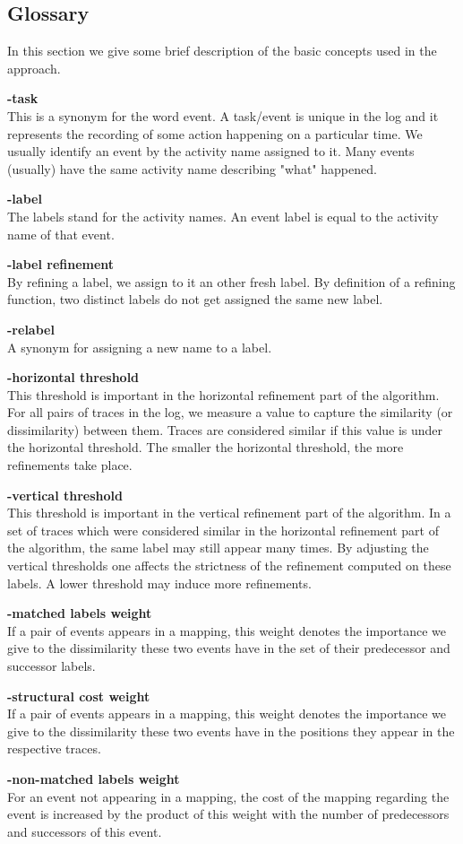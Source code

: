 \documentclass[notitlepage]{article}
\begin{document}
\begin{flushleft}
\section{Glossary}
In this section we give some brief description of the basic concepts used in the approach.
\medskip

\textbf{-task}\\
This is a synonym for the word event.
A task/event is unique in the log and it represents the recording of some action happening on a particular time.
We usually identify an event by the activity name assigned to it.
Many events (usually) have the same activity name describing "what" happened.
\medskip

\textbf{-label}\\
The labels stand for the activity names.
An event label is equal to the activity name of that event.
\medskip

\textbf{-label refinement}\\
By refining a label, we assign to it an other fresh label.
By definition of a refining function, two distinct labels do not get assigned the same new label.
\medskip

\textbf{-relabel}\\
A synonym for assigning a new name to a label.
\medskip

\textbf{-horizontal threshold}\\
This threshold is important in the horizontal refinement part of the algorithm.
For all pairs of traces in the log, we measure a value to capture the similarity (or dissimilarity) between them.
Traces are considered similar if this value is under the horizontal threshold.
The smaller the horizontal threshold, the more refinements take place.
\medskip

\textbf{-vertical threshold}\\
This threshold is important in the vertical refinement part of the algorithm.
In a set of traces which were considered similar in the horizontal refinement part of the algorithm, the same label may still appear many times.
By adjusting the vertical thresholds one affects the strictness of the refinement computed on these labels.
A lower threshold may induce more refinements.
\medskip

\textbf{-matched labels weight}\\
If a pair of events appears in a mapping, this weight denotes the importance we give to the dissimilarity these two events have in the set of their predecessor and successor labels.
\medskip

\textbf{-structural cost weight}\\
If a pair of events appears in a mapping, this weight denotes the importance we give to the dissimilarity these two events have in the positions they appear in the respective traces.
\medskip

\textbf{-non-matched labels weight}\\
For an event not appearing in a mapping, the cost of the mapping regarding the event is increased by the product of this weight with the number of predecessors and successors of this event.
\medskip

\end{flushleft}
\end{document}
